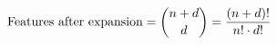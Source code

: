 \documentclass[preview]{standalone}
\begin{document}
\begin{align*}
\special{dvisvgm:raw <g id='unique000'>}\text{Features after expansion} = \binom{n+d}{d} = \frac{(n+d)!}{n! \cdot d!}\special{dvisvgm:raw </g>}
\end{align*}
\end{document}
